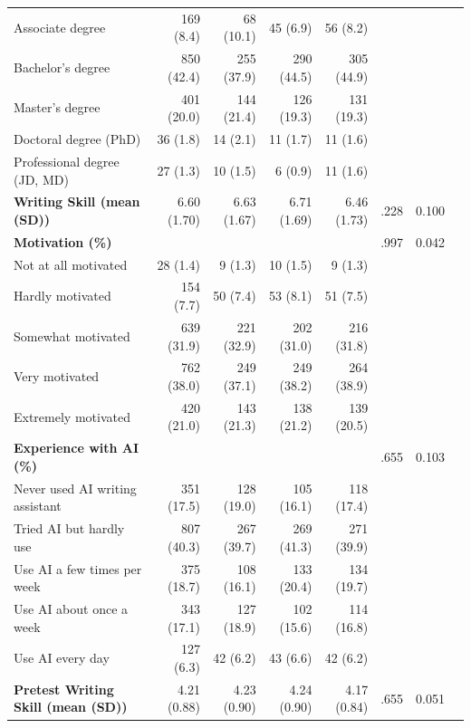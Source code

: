 \documentclass[11pt]{report}
\begin{document}
\begin{append}
\begin{table}[h]
\begin{tabular}{lrrrrrrr}
\hspace{1em}Associate degree & 169 (8.4) & 68 (10.1) & 45 (6.9) & 56 (8.2) & &  \\ 
\hspace{1em}Bachelor's degree & 850 (42.4) & 255 (37.9) & 290 (44.5) & 305 (44.9) & &  \\ 
\hspace{1em}Master's degree & 401 (20.0) & 144 (21.4) & 126 (19.3) & 131 (19.3) & &  \\ 
\hspace{1em}Doctoral degree (PhD) & 36 (1.8) & 14 (2.1) & 11 (1.7) & 11 (1.6) & &  \\ 
\hspace{1em}Professional degree (JD, MD) & 27 (1.3) & 10 (1.5) & 6 (0.9) & 11 (1.6) & &  \\ 
\textbf{Writing Skill (mean (SD))} & 6.60 (1.70) & 6.63 (1.67) & 6.71 (1.69) & 6.46 (1.73) & .228 & 0.100 \\ 
\textbf{Motivation (\%)} &  &   &   &   & .997 &  0.042 \\ 
\hspace{1em}Not at all motivated & 28 (1.4) & 9 (1.3) & 10 (1.5) & 9 (1.3) &  &  \\ 
\hspace{1em}Hardly motivated & 154 (7.7) & 50 (7.4) & 53 (8.1) & 51 (7.5) &  &  \\ 
\hspace{1em}Somewhat motivated & 639 (31.9) & 221 (32.9) & 202 (31.0) & 216 (31.8) &  &  \\ 
\hspace{1em}Very motivated & 762 (38.0) & 249 (37.1) & 249 (38.2) & 264 (38.9) &  &  \\ 
\hspace{1em}Extremely motivated & 420 (21.0) & 143 (21.3) & 138 (21.2) & 139 (20.5) &  &  \\ 
\textbf{Experience with AI (\%)} &  &   &   &   & .655 & 0.103 \\ 
\hspace{1em}Never used AI writing assistant & 351 (17.5) & 128 (19.0) & 105 (16.1) & 118 (17.4) & &  \\ 
\hspace{1em}Tried AI but hardly use & 807 (40.3) & 267 (39.7) & 269 (41.3) & 271 (39.9) & &  \\ 
\hspace{1em}Use AI a few times per week & 375 (18.7) & 108 (16.1) & 133 (20.4) & 134 (19.7) & &  \\ 
\hspace{1em}Use AI about once a week & 343 (17.1) & 127 (18.9) & 102 (15.6) & 114 (16.8) & &  \\ 
\hspace{1em}Use AI every day & 127 (6.3) & 42 (6.2) & 43 (6.6) & 42 (6.2) & &  \\ 
\textbf{Pretest Writing Skill (mean (SD))} & 4.21 (0.88) & 4.23 (0.90) & 4.24 (0.90) & 4.17 (0.84) & .655 & 0.051 \\ 
\bottomrule
\end{tabular}
\label{tab:s3randomization}
\end{table}



\end{append}
\end{document}
